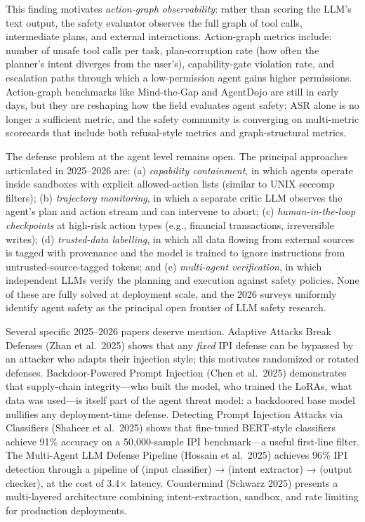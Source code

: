 \documentclass{article}
\begin{document}
This finding motivates \emph{action-graph observability}: rather than scoring the LLM's text output, the safety evaluator observes the full graph of tool calls, intermediate plans, and external interactions. Action-graph metrics include: number of unsafe tool calls per task, plan-corruption rate (how often the planner's intent diverges from the user's), capability-gate violation rate, and escalation paths through which a low-permission agent gains higher permissions. Action-graph benchmarks like Mind-the-Gap and AgentDojo are still in early days, but they are reshaping how the field evaluates agent safety: ASR alone is no longer a sufficient metric, and the safety community is converging on multi-metric scorecards that include both refusal-style metrics and graph-structural metrics.

The defense problem at the agent level remains open. The principal approaches articulated in 2025--2026 are: (a) \emph{capability containment}, in which agents operate inside sandboxes with explicit allowed-action lists (similar to UNIX seccomp filters); (b) \emph{trajectory monitoring}, in which a separate critic LLM observes the agent's plan and action stream and can intervene to abort; (c) \emph{human-in-the-loop checkpoints} at high-risk action types (e.g., financial transactions, irreversible writes); (d) \emph{trusted-data labelling}, in which all data flowing from external sources is tagged with provenance and the model is trained to ignore instructions from untrusted-source-tagged tokens; and (e) \emph{multi-agent verification}, in which independent LLMs verify the planning and execution against safety policies. None of these are fully solved at deployment scale, and the 2026 surveys uniformly identify agent safety as the principal open frontier of LLM safety research.

Several specific 2025--2026 papers deserve mention. Adaptive Attacks Break Defenses (Zhan et al.~2025) shows that any \emph{fixed} IPI defense can be bypassed by an attacker who adapts their injection style; this motivates randomized or rotated defenses. Backdoor-Powered Prompt Injection (Chen et al.~2025) demonstrates that supply-chain integrity---who built the model, who trained the LoRAs, what data was used---is itself part of the agent threat model: a backdoored base model nullifies any deployment-time defense. Detecting Prompt Injection Attacks via Classifiers (Shaheer et al.~2025) shows that fine-tuned BERT-style classifiers achieve 91\% accuracy on a 50,000-sample IPI benchmark---a useful first-line filter. The Multi-Agent LLM Defense Pipeline (Hossain et al.~2025) achieves 96\% IPI detection through a pipeline of (input classifier) → (intent extractor) → (output checker), at the cost of 3.4× latency. Countermind (Schwarz 2025) presents a multi-layered architecture combining intent-extraction, sandbox, and rate limiting for production deployments.
\end{document}
